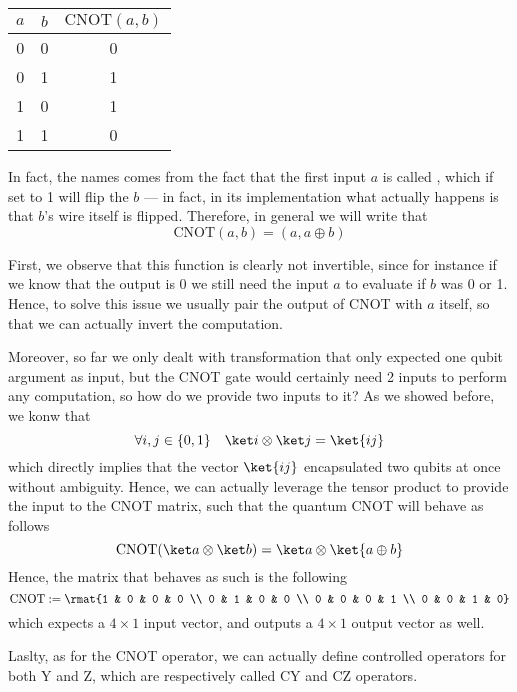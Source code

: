 \documentclass[a4paper, 12pt]{report}
\begin{document}
\begin{center}
	\begin{tabular}{cc|c}
		\hline
		$a$ & $b$ & $\mbox{CNOT}(a, b)$ \\
		\hline\hline
		0   & 0   & 0                   \\
		\hline
		0   & 1   & 1                   \\
		\hline
		1   & 0   & 1                   \\
		\hline
		1   & 1   & 0                   \\
		\hline
	\end{tabular}
\end{center}

In fact, the names comes from the fact that the first input $a$ is called , which if set to 1 will flip the  $b$ --- in fact, in its implementation what actually happens is that $b$'s wire itself is flipped. Therefore, in general we will write that $$\mbox{CNOT}(a, b) = (a, a \oplus b)$$

First, we observe that this function is clearly not invertible, since for instance if we know that the output is 0 we still need the input $a$ to evaluate if $b$ was 0 or 1. Hence, to solve this issue we usually pair the output of CNOT with $a$ itself, so that we can actually invert the computation.

Moreover, so far we only dealt with transformation that only expected one qubit argument as input, but the CNOT gate would certainly need 2 inputs to perform any computation, so how do we provide two inputs to it? As we showed before, we konw that $$\forall i, j \in \{0, 1\} \quad \ket i \otimes \ket j = \ket{i j}$$ which directly implies that the vector $\ket{ij}$ encapsulated two qubits at once without ambiguity. Hence, we can actually leverage the tensor product to provide the input to the CNOT matrix, such that the quantum CNOT will behave as follows $$\mbox{CNOT}(\ket a \otimes \ket b) = \ket a \otimes \ket{a \oplus b}$$ Hence, the matrix that behaves as such is the following $$\mbox{CNOT} := \rmat{1 & 0 & 0 & 0 \\ 0 & 1 & 0 & 0 \\ 0 & 0 & 0 & 1 \\ 0 & 0 & 1 & 0}$$ which expects a $4 \times 1$ input vector, and outputs a $4 \times 1$ output vector as well.

Laslty, as for the CNOT operator, we can actually define controlled operators for both Y and Z, which are respectively called CY and CZ operators.
\end{document}
